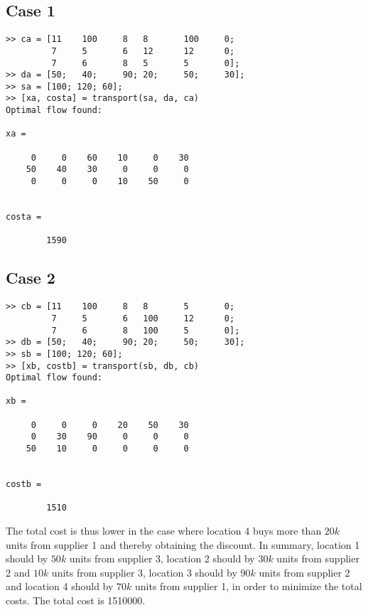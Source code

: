 \documentclass{article}
\begin{document}
  \subsection*{Case 1}
  \begin{lstlisting}
>> ca = [11    100     8   8       100     0; 
         7     5       6   12      12      0; 
         7     6       8   5       5       0];
>> da = [50;   40;     90; 20;     50;     30];
>> sa = [100; 120; 60];
>> [xa, costa] = transport(sa, da, ca)
Optimal flow found:

xa =

     0     0    60    10     0    30
    50    40    30     0     0     0
     0     0     0    10    50     0


costa =

        1590
  \end{lstlisting}

  \subsection*{Case 2}
  \begin{lstlisting}
>> cb = [11    100     8   8       5       0; 
         7     5       6   100     12      0; 
         7     6       8   100     5       0];
>> db = [50;   40;     90; 20;     50;     30];
>> sb = [100; 120; 60];
>> [xb, costb] = transport(sb, db, cb)
Optimal flow found:

xb =

     0     0     0    20    50    30
     0    30    90     0     0     0
    50    10     0     0     0     0


costb =

        1510
  \end{lstlisting}

  \noindent
  The total cost is thus lower in the case where location 4 buys more than $20k$ units from supplier 1 and thereby obtaining the discount. In summary, location 1 should by $50k$ units from supplier 3, location 2 should by $30k$ units from supplier 2 and $10k$ units from supplier 3, location 3 should by $90k$ units from supplier 2 and location 4 should by $70k$ units from supplier 1, in order to minimize the total costs. The total cost is 1510000.
\end{document}

